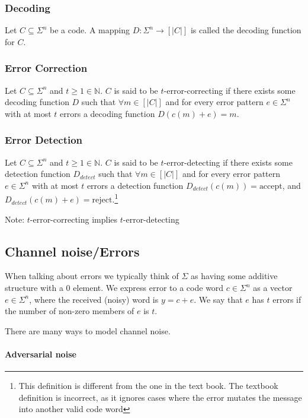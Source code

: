 \documentclass{idc_msc}
\begin{document}
\subsubsection{Decoding}

Let $C \subseteq \Sigma^n$ be a code. A mapping $D : \Sigma^n \to [|C|]$ is called the decoding function for $C$.

\subsubsection{Error Correction}

Let $C \subseteq \Sigma^n$ and $t \ge 1 \in \mathbb{N}$. $C$ is said to be $t$-error-correcting if there exists some decoding function $D$ such that $\forall m \in [|C|]$ and for every error pattern $e \in \Sigma^n$ with at most $t$ errors a decoding function $D(c(m) + e) = m$.

\subsubsection{Error Detection}

Let $C \subseteq \Sigma^n$ and $t \ge 1 \in \mathbb{N}$. $C$ is said to be $t$-error-detecting if there exists some detection function $D_{detect}$ such that $\forall m \in [|C|]$ and for every error pattern $e \in \Sigma^n$ with at most $t$ errors a detection function $D_{detect}(c(m)) = \text{accept}$, and $D_{detect}(c(m) + e) = \text{reject}$.\footnote{This definition is different from the one in the text book. The textbook definition is incorrect, as it ignores cases where the error mutates the message into another valid code word}

Note: $t$-error-correcting implies $t$-error-detecting

\subsection{Channel noise/Errors}

When talking about errors we typically think of $\Sigma$ as having some additive structure with a $0$ element.
We express error to a code word $c \in \Sigma^n$ as a vector $e \in \Sigma^n$, where the received (noisy) word is $y = c + e$.
We say that $e$ has $t$ errors if the number of non-zero members of $e$ is $t$.

There are many ways to model channel noise.

\paragraph{Adversarial noise}
\end{document}

